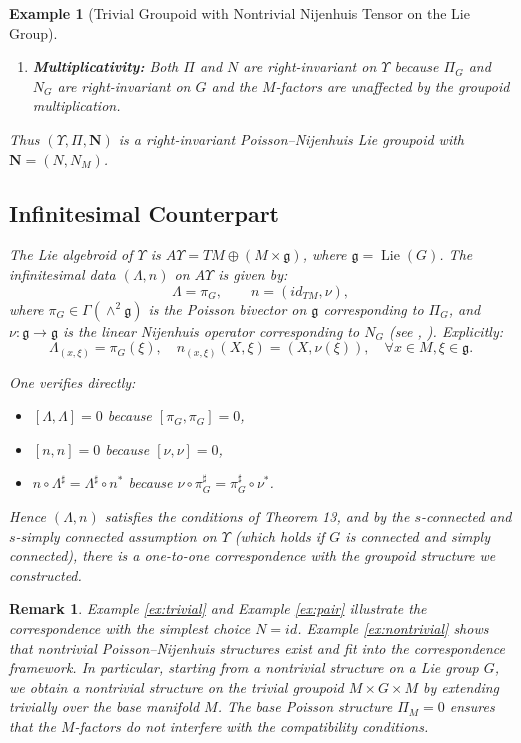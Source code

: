 \documentclass{article}
\newcommand{\II}{\Pi}
\newcommand{\NN}{\mathbf{N}}
\newcommand{\LL}{\Lambda}
\newtheorem{example}[theorem]{Example}
\newtheorem{remark}[theorem]{Remark}
\begin{document}
\begin{example}[Trivial Groupoid with Nontrivial Nijenhuis Tensor on the Lie Group]
\begin{enumerate}
    \item \textbf{Multiplicativity:} Both $\II$ and $N$ are right-invariant on $\Upsilon$ because $\Pi_G$ and $N_G$ are right-invariant on $G$ and the $M$-factors are unaffected by the groupoid multiplication.
\end{enumerate}

Thus $(\Upsilon, \II, \NN)$ is a right-invariant Poisson–Nijenhuis Lie groupoid with $\NN = (N, N_M)$.

\subsection*{Infinitesimal Counterpart}

The Lie algebroid of $\Upsilon$ is $A\Upsilon = TM \oplus (M \times \mathfrak{g})$, where $\mathfrak{g} = \operatorname{Lie}(G)$. The infinitesimal data $(\LL, n)$ on $A\Upsilon$ is given by:
\[
\LL = \pi_G, \qquad n = (id_{TM}, \nu),
\]
where $\pi_G \in \Gamma(\wedge^2 \mathfrak{g})$ is the Poisson bivector on $\mathfrak{g}$ corresponding to $\Pi_G$, and $\nu: \mathfrak{g} \to \mathfrak{g}$ is the linear Nijenhuis operator corresponding to $N_G$ (see \cite{Haghighat}, \cite{Ravanpak}). Explicitly:
\[
\LL_{(x, \xi)} = \pi_G(\xi), \quad n_{(x, \xi)}(X, \xi) = (X, \nu(\xi)), \quad \forall x \in M, \xi \in \mathfrak{g}.
\]

One verifies directly:
\begin{itemize}
    \item $[\LL, \LL] = 0$ because $[\pi_G, \pi_G] = 0$,
    \item $[n, n] = 0$ because $[\nu, \nu] = 0$,
    \item $n \circ \LL^\sharp = \LL^\sharp \circ n^*$ because $\nu \circ \pi_G^\sharp = \pi_G^\sharp \circ \nu^*$.
\end{itemize}

Hence $(\LL, n)$ satisfies the conditions of Theorem 13, and by the $s$-connected and $s$-simply connected assumption on $\Upsilon$ (which holds if $G$ is connected and simply connected), there is a one-to-one correspondence with the groupoid structure we constructed.
\end{example}

\vspace{0.5cm}

\begin{remark}
Example \ref{ex:trivial} and Example \ref{ex:pair} illustrate the correspondence with the simplest choice $N = id$. Example \ref{ex:nontrivial} shows that nontrivial Poisson–Nijenhuis structures exist and fit into the correspondence framework. In particular, starting from a nontrivial structure on a Lie group $G$, we obtain a nontrivial structure on the trivial groupoid $M \times G \times M$ by extending trivially over the base manifold $M$. The base Poisson structure $\Pi_M = 0$ ensures that the $M$-factors do not interfere with the compatibility conditions.
\end{remark}
\end{document}
